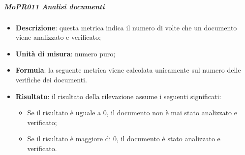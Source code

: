 \documentclass[../norme-di-progetto.tex]{subfiles}
\begin{document}
\subparagraph{MoPR011 Analisi documenti}
\begin{itemize}
  \item \textbf{Descrizione}: questa metrica indica il numero di volte che un documento viene analizzato e verificato;
  \item \textbf{Unità di misura}: numero puro;
  \item \textbf{Formula}: la seguente metrica viene calcolata unicamente sul numero delle verifiche dei documenti.
  \item \textbf{Risultato}: il risultato della rilevazione assume i seguenti significati:
  \begin{itemize}
    \item Se il risultato è uguale a 0, il documento non è mai stato analizzato e verificato;
    \item Se il risultato è maggiore di 0, il documento è stato analizzato e verificato.
  \end{itemize}
\end{itemize}
\end{document}
